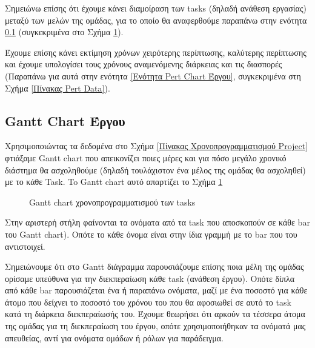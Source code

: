 \documentclass[12pt,a4paper]{article}
\begin{document}
Σημειώνω επίσης ότι έχουμε κάνει διαμοίραση των tasks (δηλαδή ανάθεση εργασίας) μεταξύ των μελών της ομάδας, για το οποίο θα αναφερθούμε παραπάνω στην ενότητα \ref{Ενότητα Gantt Chart Έργου} (συγκεκριμένα στο Σχήμα \ref{Gantt chart χρονοπρογραμματισμού των tasks}).

Έχουμε επίσης κάνει εκτίμηση χρόνων χειρότερης περίπτωσης, καλύτερης περίπτωσης και έχουμε υπολογίσει τους χρόνους αναμενόμενης διάρκειας και τις διασπορές (Παραπάνω για αυτά στην ενότητα \ref{Ενότητα Pert Chart Έργου}, συγκεκριμένα στη Σχήμα \ref{Πίνακας Pert Data}).

\subsection{Gantt Chart Έργου}
\label{Ενότητα Gantt Chart Έργου}
Χρησιμοποιώντας τα δεδομένα στο Σχήμα \ref{Πίνακας Χρονοπρογραμματισμού Project} φτιάξαμε Gantt chart που απεικονίζει ποιες μέρες και για πόσο μεγάλο χρονικό διάστημα θα ασχοληθούμε (δηλαδή τουλάχιστον ένα μέλος της ομάδας θα ασχοληθεί) με το κάθε Task. To Gantt chart αυτό απαρτίζει το Σχήμα \ref{Gantt chart χρονοπρογραμματισμού των tasks}

\begin{figure}[H]
	\caption{Gantt chart χρονοπρογραμματισμού των tasks}
	\label{Gantt chart χρονοπρογραμματισμού των tasks}
\end{figure}

Στην αριστερή στήλη φαίνονται τα ονόματα από τα task που αποσκοπούν σε κάθε bar του Gantt chart). Οπότε το κάθε όνομα είναι στην ίδια γραμμή με το bar που του αντιστοιχεί.

Σημειώνουμε ότι στο Gantt διάγραμμα παρουσιάζουμε επίσης ποια μέλη της ομάδας ορίσαμε υπεύθυνα για την διεκπεραίωση κάθε task (ανάθεση έργου). Οπότε δίπλα από κάθε bar παρουσιάζεται ένα ή παραπάνω ονόματα, μαζί με ένα ποσοστό για κάθε άτομο που δείχνει το ποσοστό του χρόνου του που θα αφοσιωθεί σε αυτό το task κατά τη διάρκεια διεκπεραίωσής του. Έχουμε θεωρήσει ότι αρκούν τα τέσσερα άτομα της ομάδας για τη διεκπεραίωση του έργου, οπότε χρησιμοποιήθηκαν τα ονόματά μας απευθείας, αντί για ονόματα ομάδων ή ρόλων για παράδειγμα.
\end{document}
